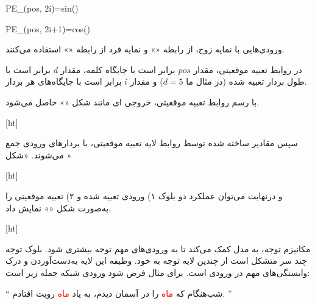 PE_{(pos, 2i)}=sin()



PE_{(pos, 2i+1)}=cos()


ورودی‌هایی با نمایه زوج، از رابطه «» و نمایه فرد از رابطه «» استفاده می‌کنند.

در روابط تعبیه موقعیتی، مقدار $pos$ برابر است با جایگاه کلمه، مقدار $d$ برابر است با طول بردار تعبیه شده (در مثال ما $d=5$) و مقدار $i$ برابر است با جایگاه‌های هر بردار.


با رسم روابط تعبیه موقعیتی، خروجی ای مانند شکل «» حاصل می‌شود.

[ht]



سپس مقادیر ساخته شده توسط روابط لایه تعبیه موقعیتی، با بردار‌های ورودی جمع می‌شوند. «شکل »

[ht]


و درنهایت می‌توان عملکرد دو بلوک ۱) ورودی تعبیه شده و ۲) تعبیه موقعیتی را به‌صورت شکل «» نمایش داد.

[ht]





مکانیزم توجه، به مدل کمک می‌کند تا به ورودی‌های مهم توجه بیشتری شود. بلوک توجه چند سر متشکل است از چندین لایه توجه به خود. وظیفه این لایه به‌دست‌آوردن و درک وابستگی‌های مهم در ورودی است. برای مثال فرض شود ورودی شبکه جمله زیر است:


\begin{center}
	`` شب‌هنگام که \textcolor{red}{ماه} را در آسمان دیدم، به یاد \textcolor{red}{ماه} رویت افتادم. ''
\end{center}

